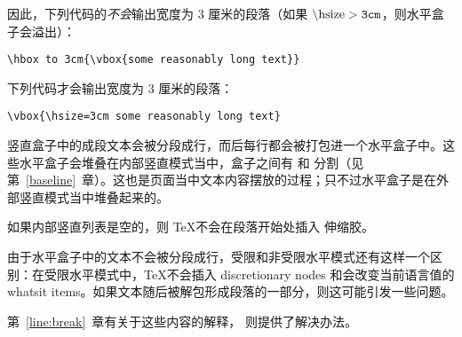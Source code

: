 \documentclass{book}
\begin{document}
因此，下列代码的\emph{不会}输出宽度为 3 厘米的段落（如果 $\text{\textbackslash hsize} > \text{{\tt 3cm}}$，则水平盒子会溢出）：
\begin{verbatim}
\hbox to 3cm{\vbox{some reasonably long text}}
\end{verbatim}
下列代码才会输出宽度为 3 厘米的段落：
\begin{verbatim}
\vbox{\hsize=3cm some reasonably long text}
\end{verbatim}

竖直盒子中的成段文本会被分段成行，而后每行都会被打包进一个水平盒子中。这些水平盒子会堆叠在内部竖直模式当中，盒子之间有  和  分割（见第~\ref{baseline}~章）。这也是页面当中文本内容摆放的过程；只不过水平盒子是在外部竖直模式当中堆叠起来的。

如果内部竖直列表是空的，则 \TeX 不会在段落开始处插入  伸缩胶。

由于水平盒子中的文本不会被分段成行，受限和非受限水平模式还有这样一个区别：在受限水平模式中，\TeX 不会插入 discretionary nodes 和会改变当前语言值的 whatsit items。如果文本随后被解包形成段落的一部分，则这可能引发一些问题。\xeCJKnobreak
\label{wide:vbox}

第~\ref{line:break}~章有关于这些内容的解释，\cite{Downs} 则提供了解决办法。

\end{document}
